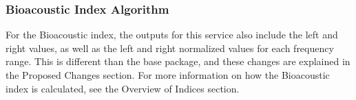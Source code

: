 \subsubsection{Bioacoustic Index Algorithm}
For the Bioacoustic index, the outputs for this service also include the left and right values, as well as the left and right normalized values for each frequency range. This is different than the base  package, and these changes are explained in the Proposed Changes section. For more information on how the Bioacoustic index is calculated, see the Overview of Indices section.
